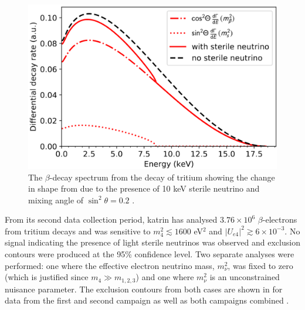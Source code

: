 \begin{figure}[h!]
    \centering
    \includegraphics[width = \largefigwidth]{figures-chap2/KATRIN_kink.png}
    \caption[$\beta$-decay spectrum from tritium decay with the inclusion of the presence of a sterile neutrino.]{The $\beta$-decay spectrum from the decay of tritium showing the change in shape from due to the presence of 10 keV sterile neutrino and mixing angle of $\sin^2{\theta} = 0.2$ \cite{A_novel_detector_system_for_KATRIN_to_search_for_keV_scale_sterile_neutrinos}.}
    \label{fig:katrin_kink_beta_decay}
\end{figure}

From its second data collection period, \gls{katrin} has analysed $3.76 \times 10^6$ \mbox{$\beta$-electrons} from tritium decays and was sensitive to $m_4^2 \lesssim 1600$ eV$^2$ and \mbox{$|U_{e4}|^2 \gtrsim 6 \times 10^{-3}$}. No signal indicating the presence of light sterile neutrinos was observed and exclusion contours were produced at the 95\% confidence level. Two separate analyses were performed: one where the effective electron neutrino mass, $m_{\nu}^2$, was fixed to zero (which is justified since $m_4 \gg m_{1,2,3}$) and one where $m_{\nu}^2$ is an unconstrained nuisance parameter. The exclusion contours from both cases are shown in  for data from the first and second campaign as well as both campaigns combined \cite{KATRIN_sterile_neutrino_results}. 

